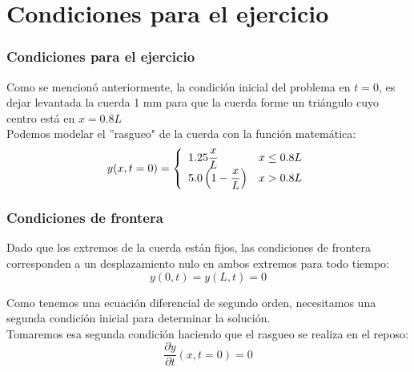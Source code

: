 \section{Condiciones para el ejercicio}
\begin{frame}
\frametitle{Condiciones para el ejercicio}
Como se mencionó anteriormente, la condición inicial del problema en $t=0$, es dejar levantada la cuerda 1 mm para que la cuerda forme un triángulo cuyo centro está en $x=0.8L$
\\
\medskip
Podemos modelar el ''rasgueo" de la cuerda con la función matemática:
\[
y(x,t=0) = \left\lbrace \begin{array}{l l}
1.25 \dfrac{x}{L} & x \leq 0.8 L \\
5.0 \left( 1- \dfrac{x}{L} \right) & x > 0.8 L
\end{array} \right. \]
\end{frame}
\begin{frame}
\frametitle{Condiciones de frontera}
Dado que los extremos de la cuerda están fijos, las condiciones de frontera corresponden a un desplazamiento nulo en ambos extremos para todo tiempo:
\[y(0,t) = y(L,t) = 0\]
\end{frame}
\begin{frame}
Como tenemos una ecuación diferencial de segundo orden, necesitamos una segunda condición inicial para determinar la solución. 
\\
\bigskip
Tomaremos esa segunda condición haciendo que el rasgueo se realiza en el reposo:
\[ \dfrac{\partial y}{\partial t} (x,t=0) = 0 \]
\end{frame}
